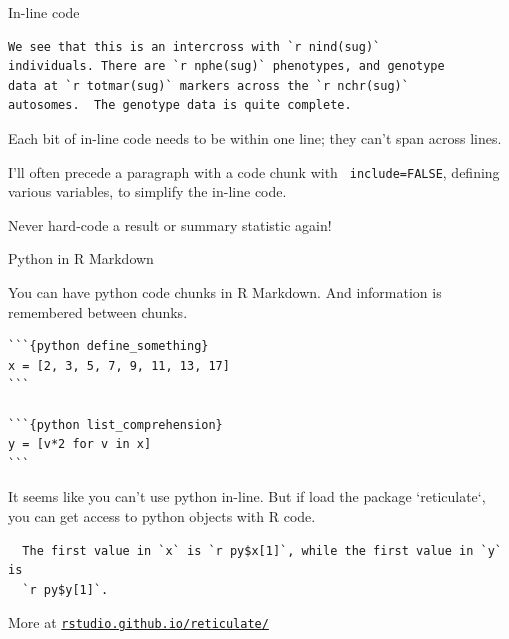 \documentclass[aspectratio=169,12pt,t]{beamer}
\begin{document}
\begin{frame}[fragile]{In-line code}

\vspace{24pt}

\begin{lstlisting}
We see that this is an intercross with `r nind(sug)`
individuals. There are `r nphe(sug)` phenotypes, and genotype
data at `r totmar(sug)` markers across the `r nchr(sug)`
autosomes.  The genotype data is quite complete.
\end{lstlisting}

\vfill

\bi
\itemsep12pt
\item Each bit of in-line code needs to be within one line; they
  {\hilit can't}
  span across lines.
\item I'll often precede a paragraph with a code chunk with {\tt
  include=FALSE}, defining various variables, to simplify the in-line
  code.
\item Never hard-code a result or summary statistic again!
\ei

\end{frame}

\begin{frame}[fragile]{Python in R Markdown}

You can have python code chunks in R Markdown. And information is
remembered between chunks.

\begin{lstlisting}
```{python define_something}
x = [2, 3, 5, 7, 9, 11, 13, 17]
```

```{python list_comprehension}
y = [v*2 for v in x]
```
\end{lstlisting}

It seems like you can't use python in-line. But if load the
package `reticulate`, you can get access to python objects with R
code.

\begin{lstlisting}
  The first value in `x` is `r py$x[1]`, while the first value in `y` is
  `r py$y[1]`.
\end{lstlisting}

\vfill

\centerline{More at \href{https://rstudio.github.io/reticulate/}{\tt rstudio.github.io/reticulate/}}


\end{frame}
\end{document}
